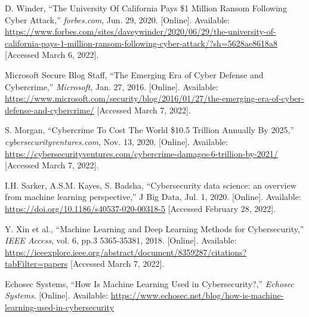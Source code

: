 \begin{thebibliography}{99}
    D. Winder, ``The University Of California Pays \$1 Million Ransom Following Cyber Attack,''
    \textit{forbes.com}, Jun. 29, 2020. [Online].
    Available: \href{https://www.forbes.com/sites/daveywinder/2020/06/29/the-university-of-california-pays-1-million-ransom-following-cyber-attack/?sh=5628ae8618a8}{https://www.forbes.com/sites/daveywinder/2020/06/29/the-university-of-california-pays-1-million-ransom-following-cyber-attack/?sh=5628ae8618a8}
    [Accessed March 6, 2022].

    Microsoft Secure Blog Staff, ``The Emerging Era of Cyber Defense and Cybercrime,''
    \textit{Microsoft}, Jan. 27, 2016. [Online].
    Available: \href{https://www.microsoft.com/security/blog/2016/01/27/the-emerging-era-of-cyber-defense-and-cybercrime/}{https://www.microsoft.com/security/blog/2016/01/27/the-emerging-era-of-cyber-defense-and-cybercrime/}
    [Accessed March 7, 2022].

    S. Morgan, ``Cybercrime To Cost The World \$10.5 Trillion Annually By 2025,''
    \textit{cybersecurityventures.com}, Nov. 13, 2020. [Online].
    Available: \href{https://cybersecurityventures.com/cybercrime-damages-6-trillion-by-2021/}{https://cybersecurityventures.com/cybercrime-damages-6-trillion-by-2021/}
    [Accessed March 7, 2022].

    I.H. Sarker, A.S.M. Kayes, S. Badsha, ``Cybersecurity data science: an overview from machine learning perspective,''
    J Big Data, Jul. 1, 2020. [Online].
    Available: \href{https://doi.org/10.1186/s40537-020-00318-5}{https://doi.org/10.1186/s40537-020-00318-5}
    [Accessed February 28, 2022].

    Y. Xin et al., ``Machine Learning and Deep Learning Methods for Cybersecurity,''
    \textit{IEEE Access}, vol. 6, pp.3 5365-35381, 2018. [Online].
    Available: \href{https://ieeexplore.ieee.org/abstract/document/8359287/citations?tabFilter=papers}{https://ieeexplore.ieee.org/abstract/document/8359287/citations?tabFilter=papers}
    [Accessed March 7, 2022].

    Echosec Systems, ``How Is Machine Learning Used in Cybersecurity?,''
    \textit{Echosec Systems}. [Online].
    Available: \href{https://www.echosec.net/blog/how-is-machine-learning-used-in-cybersecurity}{https://www.echosec.net/blog/how-is-machine-learning-used-in-cybersecurity}


\end{thebibliography}
